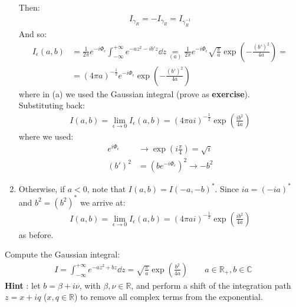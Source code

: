 \documentclass[../template.tex]{subfiles}
\begin{document}
\begin{example}
\begin{enumerate}
    Then:
    \begin{align*}
        I_{\gamma_R} = - I_{\bar{\gamma}_R} = I_{\bar{\gamma}_R^{-1}}
    \end{align*}
    And so:
    \begin{align*}
        I_\epsilon(a,b) &= \frac{1}{2 \pi} e^{-i \Phi_\epsilon} \int_{-\infty}^{+\infty}  e^{-a z^2 - ib'z} \dd{z} \underset{(a)}{=}  \frac{1}{2 \pi} e^{-i \Phi_\epsilon} \sqrt{\frac{\pi}{a}} \exp\left(-\frac{(b')^2}{4a} \right) =\\
        &= (4 \pi a)^{-\frac{1}{2}} e^{-i \Phi_\epsilon} \exp \left(-\frac{(b')^2}{4a} \right)
    \end{align*}
    where in (a) we used the Gaussian integral (prove as \textbf{exercise}).\\
    Substituting back:
    \begin{align*}
        I(a,b) = \lim_{\epsilon \to 0} I_\epsilon(a,b) = (4 \pi a i)^{-\frac{1}{2} } \exp\left(\frac{ib^2}{4a} \right) 
    \end{align*}
    where we used:
    \begin{align*}
        e^{i \Phi_\epsilon} &\to \exp\left(i\frac{\pi}{4} \right) = \sqrt{i}\\
        (b')^2 &= (b e^{-i \Phi_\epsilon})^2 \to - b^2
    \end{align*}
    \item Otherwise, if $a < 0$, note that $I(a,b) = I(-a, -b)^*$. Since $ia = (-ia)^*$ and $b^2 = (b^2)^*$ we arrive at:
    \begin{align*}
        I(a,b) = \lim_{\epsilon \to 0} I_\epsilon (a,b) = (4 \pi a i)^{-\frac{1}{2}} \exp\left(\frac{ib^2}{4a} \right)
    \end{align*}    
    as before.
\end{enumerate}
\end{example}

\begin{exo}
    Compute the Gaussian integral:
    \begin{align*}
        I = \int_{-\infty}^{+\infty} e^{-az^2 + bz} \dd{z} = \sqrt{\frac{\pi}{a} } \exp\left(\frac{b^2}{4a}\right) \qquad a \in \mathbb{R}_+, b \in \mathbb{C}
    \end{align*}
    \textbf{Hint} : let $b = \beta + i \nu$, with $\beta, \nu \in \mathbb{R}$, and perform a shift of the integration path $z = x+iq$ ($x,q \in \mathbb{R}$)  to remove all complex terms from the exponential.   
\end{exo}
\end{document}
